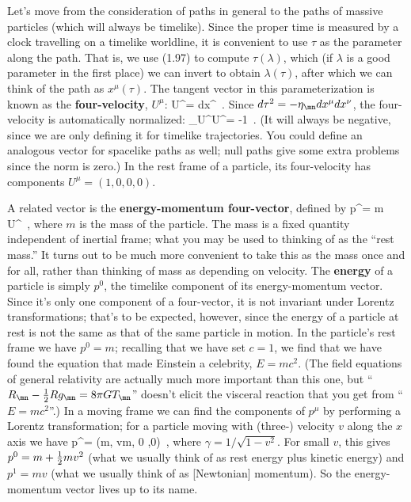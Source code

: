 \documentclass[12pt]{article}
\begin{document}
Let's move from the consideration of paths in general to the paths
of massive particles (which will always be timelike).  Since the proper 
time is measured by a clock travelling on a timelike worldline,
it is convenient to use $\tau$ as the parameter along the path.
That is, we use (1.97) to compute $\tau(\lambda)$, which (if $\lambda$
is a good parameter in the first place) we can invert to obtain
$\lambda(\tau)$, after which we can think of the path as
$x^\mu(\tau)$.  The tangent vector in this parameterization is known
as the {\bf four-velocity}, $U^\mu$:
\be
  U^\mu = {{dx^\mu}}\ .\label{1.98}
\ee
Since $d\tau^2 = -\eta_\mn dx^\mu dx^\nu$, the four-velocity is
automatically normalized:
\be
  \eta_\mn U^\mu U^\nu = -1\ .\label{1.99}
\ee
(It will always be negative, since we are only defining it for timelike
trajectories.  You could define an analogous vector for spacelike
paths as well; null paths give some extra problems since the norm is
zero.)  In the rest frame of a particle, its four-velocity has
components $U^\mu = (1,0,0,0)$.

A related vector is the {\bf energy-momentum four-vector}, defined by
\be
  p^\mu = m U^\mu\ ,\label{1.100}
\ee
where $m$ is the mass of the particle.  The mass is a fixed quantity
independent of inertial frame; what you may be used to thinking of as
the ``rest mass.''  It turns out to be much more convenient to take
this as the mass once and for all, rather than thinking of mass as
depending on velocity.  The {\bf energy} of a particle is simply
$p^0$, the timelike component of its energy-momentum vector. 
Since it's only one component of a four-vector, it is not invariant
under Lorentz transformations; that's to be expected, however, since
the energy of a particle at rest is not the same as that of the same
particle in motion.  In the
particle's rest frame we have $p^0 =m$; recalling that we have set
$c=1$, we find that we have found the equation that made Einstein
a celebrity, $E=mc^2$.  (The field equations of general relativity are
actually much more important than this one, but ``$R_\mn - {1\over 2}
Rg_\mn = 8\pi G T_\mn$'' doesn't elicit the visceral reaction that
you get from ``$E=mc^2$''.)  In a moving frame we can find the components
of $p^\mu$ by performing a Lorentz transformation; for a particle 
moving with (three-) velocity $v$ along the $x$ axis we have
\be
  p^\mu = (\gamma m, v\gamma m, 0 ,0)\ ,\label{1.101}
\ee
where $\gamma = 1/\sqrt{1-v^2}$.  For small $v$, this gives
$p^0 = m+{1\over 2}mv^2$ (what we usually think of as rest energy
plus kinetic energy) and $p^1 = mv$ (what we usually think of as
[Newtonian] momentum).  So the energy-momentum vector lives up to its 
name.
\end{document}
